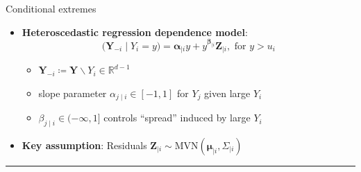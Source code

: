 \documentclass[14pt,aspectratio=169]{beamer}
\begin{document}
\begin{frame}[t, noframenumbering]{Conditional extremes}
\begin{itemize}
  \item <1-> \textbf{Heteroscedastic regression dependence model}: 
  \begin{equation*}
      \bigl(\boldsymbol{Y}_{-i} \mid Y_i = y \bigr) = \boldsymbol{\alpha}_{\mid i}y + y^{\boldsymbol{\beta}_{\mid i}}\boldsymbol{Z}_{\mid i}, \text{ for } y > u_{i}
  \end{equation*}
  \vspace{-5mm}
  \begin{itemize}
    \item <1-> $\boldsymbol{Y}_{-i} \coloneq \boldsymbol{Y} \backslash Y_i \in \mathbb{R}^{d-1}$
    \item <1-> slope parameter $\alpha_{j \mid i} \in [-1, 1]$  for $Y_j$ given large $Y_i$
    \item $\beta_{j \mid i} \in (-\infty, 1]$ controls ``spread'' induced by large $Y_i$
  \end{itemize}
  \item <1-> \textbf{Key assumption}: Residuals $\boldsymbol{Z}_{\mid i} \sim \mathrm{MVN}(\boldsymbol{\mu}_{\mid i}, \Sigma_{\mid i})$
  \vspace{2mm}
\end{itemize}
\vspace{1.3cm}
{\scriptsize
  \rule{\linewidth}{0.4pt}\\
}
\end{frame}
\end{document}
